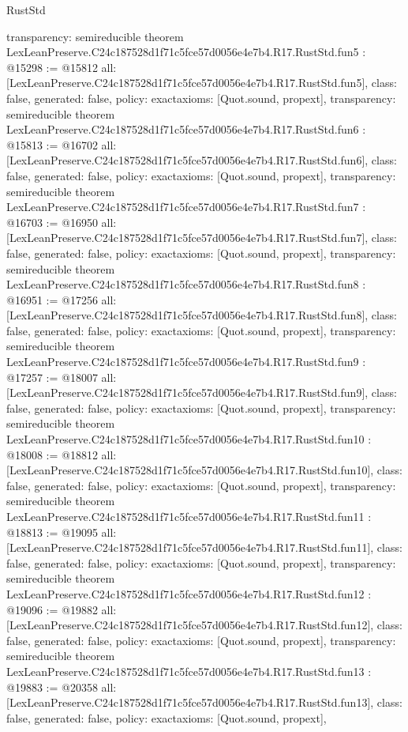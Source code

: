 \begin{lexlean}{RustStd}
\begin{coremodule}
{  transparency: semireducible
}
theorem LexLeanPreserve.C24c187528d1f71c5fce57d0056e4e7b4.R17.RustStd.fun5 : @15298 := @15812 {
  all: [LexLeanPreserve.C24c187528d1f71c5fce57d0056e4e7b4.R17.RustStd.fun5],
  class: false,
  generated: false,
  policy: exact{axioms: [Quot.sound, propext]},
  transparency: semireducible
}
theorem LexLeanPreserve.C24c187528d1f71c5fce57d0056e4e7b4.R17.RustStd.fun6 : @15813 := @16702 {
  all: [LexLeanPreserve.C24c187528d1f71c5fce57d0056e4e7b4.R17.RustStd.fun6],
  class: false,
  generated: false,
  policy: exact{axioms: [Quot.sound, propext]},
  transparency: semireducible
}
theorem LexLeanPreserve.C24c187528d1f71c5fce57d0056e4e7b4.R17.RustStd.fun7 : @16703 := @16950 {
  all: [LexLeanPreserve.C24c187528d1f71c5fce57d0056e4e7b4.R17.RustStd.fun7],
  class: false,
  generated: false,
  policy: exact{axioms: [Quot.sound, propext]},
  transparency: semireducible
}
theorem LexLeanPreserve.C24c187528d1f71c5fce57d0056e4e7b4.R17.RustStd.fun8 : @16951 := @17256 {
  all: [LexLeanPreserve.C24c187528d1f71c5fce57d0056e4e7b4.R17.RustStd.fun8],
  class: false,
  generated: false,
  policy: exact{axioms: [Quot.sound, propext]},
  transparency: semireducible
}
theorem LexLeanPreserve.C24c187528d1f71c5fce57d0056e4e7b4.R17.RustStd.fun9 : @17257 := @18007 {
  all: [LexLeanPreserve.C24c187528d1f71c5fce57d0056e4e7b4.R17.RustStd.fun9],
  class: false,
  generated: false,
  policy: exact{axioms: [Quot.sound, propext]},
  transparency: semireducible
}
theorem LexLeanPreserve.C24c187528d1f71c5fce57d0056e4e7b4.R17.RustStd.fun10 : @18008 := @18812 {
  all: [LexLeanPreserve.C24c187528d1f71c5fce57d0056e4e7b4.R17.RustStd.fun10],
  class: false,
  generated: false,
  policy: exact{axioms: [Quot.sound, propext]},
  transparency: semireducible
}
theorem LexLeanPreserve.C24c187528d1f71c5fce57d0056e4e7b4.R17.RustStd.fun11 : @18813 := @19095 {
  all: [LexLeanPreserve.C24c187528d1f71c5fce57d0056e4e7b4.R17.RustStd.fun11],
  class: false,
  generated: false,
  policy: exact{axioms: [Quot.sound, propext]},
  transparency: semireducible
}
theorem LexLeanPreserve.C24c187528d1f71c5fce57d0056e4e7b4.R17.RustStd.fun12 : @19096 := @19882 {
  all: [LexLeanPreserve.C24c187528d1f71c5fce57d0056e4e7b4.R17.RustStd.fun12],
  class: false,
  generated: false,
  policy: exact{axioms: [Quot.sound, propext]},
  transparency: semireducible
}
theorem LexLeanPreserve.C24c187528d1f71c5fce57d0056e4e7b4.R17.RustStd.fun13 : @19883 := @20358 {
  all: [LexLeanPreserve.C24c187528d1f71c5fce57d0056e4e7b4.R17.RustStd.fun13],
  class: false,
  generated: false,
  policy: exact{axioms: [Quot.sound, propext]},
}
\end{coremodule}
\end{lexlean}
